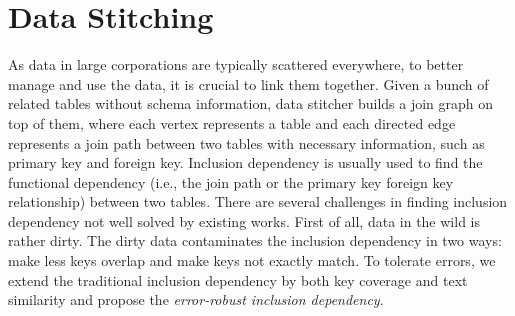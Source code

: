 \section{Data Stitching}
\label{sec:stitching}

\newcommand{\eind}{error-robust inclusion dependency\xspace}
\newcommand{\ind}{inclusion dependency\xspace}
\newcommand{\R}{\ensuremath{R}\xspace}
\renewcommand{\S}{\ensuremath{S}\xspace}
\newcommand{\X}{\ensuremath{X}\xspace}
\newcommand{\Y}{\ensuremath{Y}\xspace}
\newcommand{\RX}{\ensuremath{\R[\X]}\xspace}
\newcommand{\SY}{\ensuremath{\S[\Y]}\xspace}
\newcommand{\IND}{IND\ensuremath{(\X,\Y)}\xspace}
\newcommand{\EIND}{\texttt{EIND}\ensuremath{(\RX,\SY)}\xspace}
\newcommand\subsetsim{\mathrel{%
  \ooalign{\raise0.3ex\hbox{$\subset$}\cr\hidewidth\raise-0.6ex\hbox{\scalebox{0.8}{$\sim$}}\hidewidth\cr}}}
\newcommand{\G}{\ensuremath{G}\xspace}
\newcommand{\E}{\ensuremath{E}\xspace}
\newcommand{\U}{\ensuremath{U}\xspace}
\newcommand{\V}{\ensuremath{V}\xspace}

\newtheorem{theorem}{Theorem}
\newtheorem{example}{Example}
\newtheorem{definition}{Definition}
\newtheorem{proposition}{Proposition}
\newtheorem{lemma}{Lemma}
\newtheorem{corollary}{Corollary}






As data in large corporations are typically scattered everywhere, to better manage and use the data, it is crucial to link them together. Given a bunch of related tables without schema information, data stitcher builds a join graph on top of them, where each vertex represents a table and each directed edge represents a join path between two tables with necessary information, such as primary key and foreign key. Inclusion dependency is usually used to find the functional dependency (i.e., the join path or the primary key foreign key relationship) between two tables. There are several challenges in finding inclusion dependency not well solved by existing works. First of all, data in the wild is rather dirty. The dirty data contaminates the inclusion dependency in two ways: make less keys overlap and make keys not exactly match. To tolerate errors, we extend the traditional inclusion dependency by both key coverage and text similarity and propose the \emph{\eind}. %


